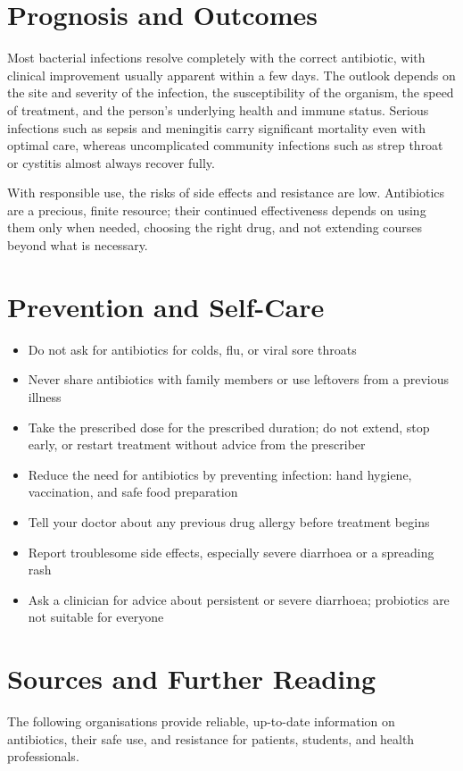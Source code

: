 \section*{Prognosis and Outcomes}
Most bacterial infections resolve completely with the correct antibiotic, with clinical improvement usually apparent within a few days. The outlook depends on the site and severity of the infection, the susceptibility of the organism, the speed of treatment, and the person's underlying health and immune status. Serious infections such as sepsis and meningitis carry significant mortality even with optimal care, whereas uncomplicated community infections such as strep throat or cystitis almost always recover fully.

With responsible use, the risks of side effects and resistance are low. Antibiotics are a precious, finite resource; their continued effectiveness depends on using them only when needed, choosing the right drug, and not extending courses beyond what is necessary.

\section*{Prevention and Self-Care}
\begin{itemize}
    \item Do not ask for antibiotics for colds, flu, or viral sore throats
    \item Never share antibiotics with family members or use leftovers from a previous illness
    \item Take the prescribed dose for the prescribed duration; do not extend, stop early, or restart treatment without advice from the prescriber
    \item Reduce the need for antibiotics by preventing infection: hand hygiene, vaccination, and safe food preparation
    \item Tell your doctor about any previous drug allergy before treatment begins
    \item Report troublesome side effects, especially severe diarrhoea or a spreading rash
    \item Ask a clinician for advice about persistent or severe diarrhoea; probiotics are not suitable for everyone
\end{itemize}

\section*{Sources and Further Reading}
The following organisations provide reliable, up-to-date information on antibiotics, their safe use, and resistance for patients, students, and health professionals.

